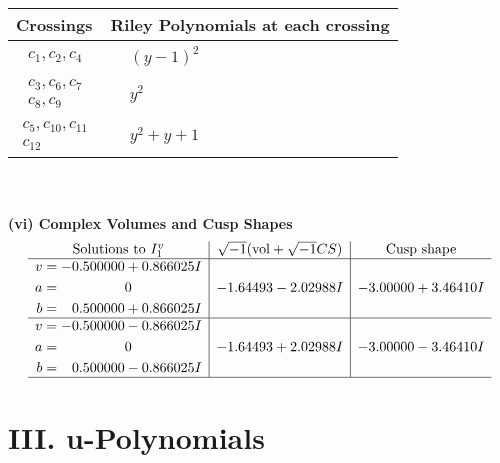 \documentclass[1p]{elsarticle_modified}
\theoremstyle{definition}
\newcommand{\I}{\sqrt{-1}}
\begin{document}
\begin{tabular}{m{50pt}|m{274pt}}
Crossings & \hspace{64pt}Riley Polynomials at each crossing \\
\hline $$\begin{aligned}c_{1},c_{2},c_{4}\end{aligned}$$&$\begin{aligned}
&(y-1)^2
\end{aligned}$\\
\hline $$\begin{aligned}c_{3},c_{6},c_{7}\\c_{8},c_{9}\end{aligned}$$&$\begin{aligned}
&y^2
\end{aligned}$\\
\hline $$\begin{aligned}c_{5},c_{10},c_{11}\\c_{12}\end{aligned}$$&$\begin{aligned}
&y^2+y+1
\end{aligned}$\\
\hline
\end{tabular}\\~\\
\newpage\flushleft \textbf{(vi) Complex Volumes and Cusp Shapes}
$$\begin{array}{c|c|c}  
\text{Solutions to }I^v_{1}& \I (\text{vol} + \sqrt{-1}CS) & \text{Cusp shape}\\
 \hline 
\begin{aligned}
v &= -0.500000 + 0.866025 I \\
a &= \phantom{-0.000000 } 0 \\
b &= \phantom{-}0.500000 + 0.866025 I\end{aligned}
 & -1.64493 - 2.02988 I & -3.00000 + 3.46410 I \\ \hline\begin{aligned}
v &= -0.500000 - 0.866025 I \\
a &= \phantom{-0.000000 } 0 \\
b &= \phantom{-}0.500000 - 0.866025 I\end{aligned}
 & -1.64493 + 2.02988 I & -3.00000 - 3.46410 I\\
 \hline 
 \end{array}$$\newpage
\newpage\renewcommand{\arraystretch}{1}
\centering \section*{ III. u-Polynomials}
\end{document}
